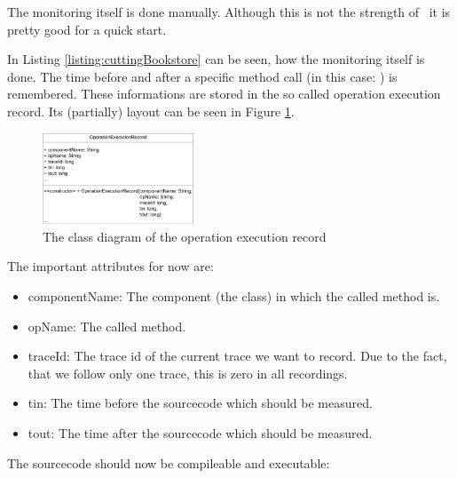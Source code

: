 		

		The monitoring itself is done manually. Although this is not the strength of \Kieker\ it is pretty good for a quick start. 

		
		
		In Listing \ref{listing:cuttingBookstore}  can be seen, how the monitoring itself is done. The time before and after a specific method call (in this case: ) is remembered. These informations are stored in the so called operation execution record. Its (partially) layout can be seen in Figure \ref{Figure:OperationExecutionRecordClassDiagram}.

		\begin{figure}[H]
			\begin{centering}
				\includegraphics[width=0.4\textwidth]{images/OpExRecClassDiagram}
				\caption{The class diagram of the operation execution record}
				\label{Figure:OperationExecutionRecordClassDiagram}
			\end{centering}
		\end{figure}

		The important attributes for now are:
		\begin{itemize}
			\item componentName: The component (the class) in which the called method is.
			\item opName: The called method.
			\item traceId: The trace id of the current trace we want to record. Due to the fact, that we follow only one trace, this is zero in all recordings.
			\item tin: The time before the sourcecode which should be measured.
			\item tout: The time after the sourcecode which should be measured.
		\end{itemize}
		The sourcecode should now be compileable and executable:

